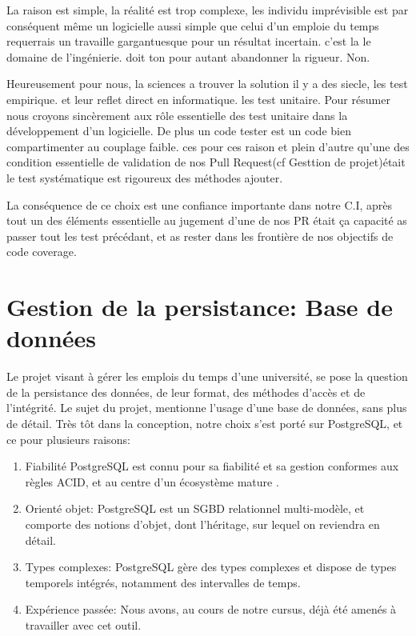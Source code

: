 \documentclass[a4paper,french,final]{memoir}
\begin{document}
La raison est simple, la réalité est trop complexe, les individu imprévisible est par conséquent même un logicielle aussi simple que celui d'un emploie du temps
requerrais un travaille gargantuesque pour un résultat incertain. c'est la le domaine de l'ingénierie.
doit ton pour autant abandonner la rigueur. Non.

Heureusement pour nous, la sciences a trouver la solution il y a des siecle, les test empirique. et leur reflet direct en informatique. les test unitaire.
Pour résumer nous croyons sincèrement aux rôle essentielle des test unitaire dans la développement d'un logicielle.  De plus un code tester est un code bien
compartimenter au couplage faible. ces pour ces raison et plein d'autre qu'une des condition essentielle de validation de nos Pull Request(cf Gesttion de projet)était le test systématique est rigoureux des méthodes ajouter.

La conséquence de ce choix est une confiance importante dans notre C.I, après tout un des éléments essentielle au jugement d'une de nos PR était ça capacité as passer tout les test précédant, et as rester dans les frontière de nos objectifs de code coverage.



\section{Gestion de la persistance: Base de données}
Le projet visant à gérer les emplois du temps d'une université, se pose la question de la persistance des données, de leur format, des méthodes d'accès et de l'intégrité. Le sujet du projet, mentionne l'usage d'une base de données, sans plus de détail. Très tôt dans la conception, notre choix s'est porté sur PostgreSQL, et ce pour plusieurs raisons: 
\begin{enumerate}
    \item  Fiabilité  PostgreSQL est connu pour sa fiabilité et sa gestion conformes aux règles ACID, et au centre d'un écosystème mature .
    \item Orienté objet: PostgreSQL est un SGBD relationnel multi-modèle, et comporte des notions d'objet, dont l'héritage, sur lequel on reviendra en détail.
    \item Types complexes: PostgreSQL gère des types complexes et dispose de types temporels intégrés, notamment des intervalles de temps.
    \item Expérience passée: Nous avons, au cours de notre cursus, déjà été amenés à travailler avec cet outil. 
\end{enumerate}
\end{document}
